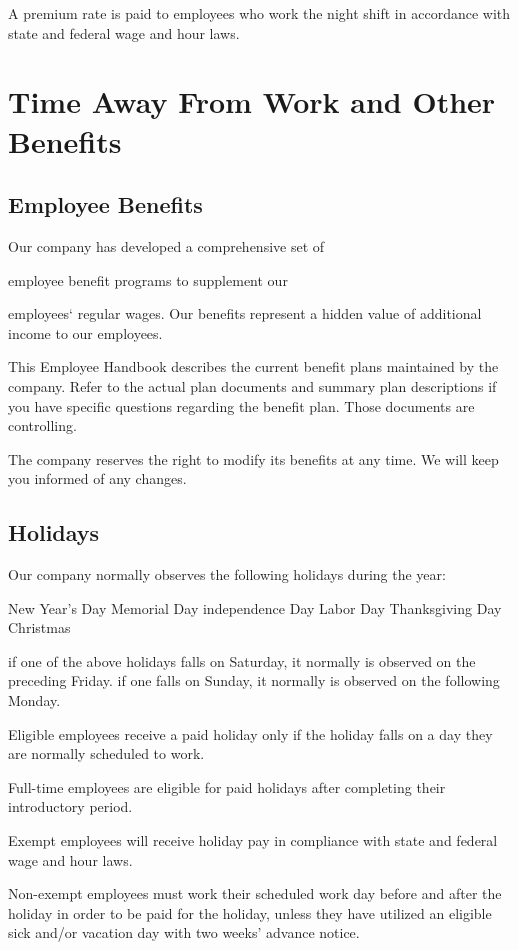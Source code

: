 A premium rate is paid to employees who work the night shift in accordance with state and federal wage and hour laws.

\section{Time Away From Work and Other Benefits}

\subsection{Employee Benefits}

Our company has developed a comprehensive set of

employee benefit programs to supplement our

employees‘ regular wages. Our benefits represent a hidden value of additional income to our employees.

This Employee Handbook describes the current benefit plans maintained by the company. Refer to the actual plan documents and summary plan descriptions if you have specific questions regarding the benefit plan. Those documents are controlling.

The company reserves the right to modify its benefits at any time. We will keep you informed of any changes.

\subsection{Holidays}

Our company normally observes the following holidays during the year:

New Year's Day Memorial Day independence Day Labor Day Thanksgiving Day Christmas

if one of the above holidays falls on Saturday, it normally is observed on the preceding Friday. if one falls on Sunday, it normally is observed on the following Monday.

Eligible employees receive a paid holiday only if the holiday falls on a day they are normally scheduled to work.

Full-time employees are eligible for paid holidays after completing their introductory period.

Exempt employees will receive holiday pay in compliance with state and federal wage and hour laws.

Non-exempt employees must work their scheduled work day before and after the holiday in order to be paid for the holiday, unless they have utilized an eligible sick and/or vacation day with two weeks’ advance notice.

